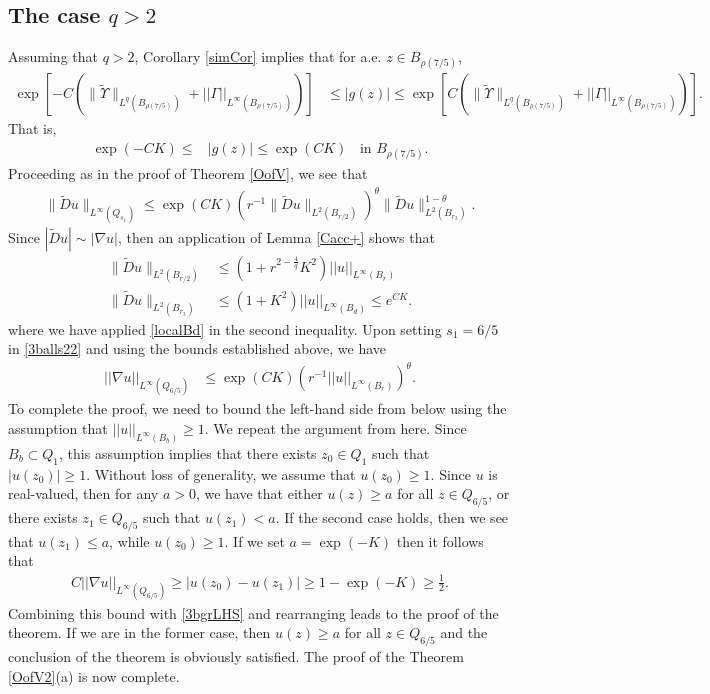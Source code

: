 \documentclass[12pt,reqno]{amsart}
\theoremstyle{plain}
\theoremstyle{definition}
\newcommand{\Ga}{\Gamma}
\newcommand{\te}{\theta}
\newcommand{\iny}{\infty}
\newcommand{\su}{\subset}
\newcommand{\gr}{\nabla}
\newcommand{\norm}[1]{\left\vert \left\vert #1\right\vert\right\vert}
\newcommand{\abs}[1]{\left\vert#1\right\vert}
\newcommand{\brac}[1]{\left[#1\right]}
\newcommand{\pr}[1]{\left( #1 \right) }
\begin{document}
\subsection{The case $q > 2$}
Assuming that $q > 2$, Corollary \ref{simCor} implies that for a.e. $z \in B_{\rho\pr{7/5}}$,
\begin{align*}
\exp\brac{-C \pr{ \|\widetilde \Upsilon\|_{L^q\pr{B_{\rho\pr{7/5}}}} +  \norm{\Ga}_{L^{\iny}\pr{B_{\rho\pr{7/5}}}}}} 
&\le \abs{g\pr{z}} \le \exp\brac{C \pr{ \|\widetilde \Upsilon\|_{L^q\pr{B_{\rho\pr{7/5}}}} +  \norm{\Ga}_{L^{\iny}\pr{B_{\rho\pr{7/5}}}}}}.
\end{align*}
That is,
\begin{align}
\exp\pr{-C K } \le & \abs{g\pr{z}} \le \exp\pr{C K} \;\; \text{ in } B_{\rho\pr{7/5}}.
\label{gBnd2}
\end{align}
Proceeding as in the proof of Theorem \ref{OofV}, we see that
\begin{align}
\| \widetilde D u\|_{L^\iny\pr{Q_{s_1}}} \le \exp\pr{C K} \pr{r^{-1}\|\widetilde D u\|_{L^2\pr{B_{r/2}}}}^\te \| \widetilde D u\|_{L^2\pr{B_{r_3}}}^{1 - \te}.
\label{3balls22}
\end{align}
Since $|\widetilde D u| \sim \abs{\gr u}$, then an application of Lemma \ref{Cacc+} shows that
\begin{align*}
\|\widetilde D u\|_{L^2\pr{B_{r/2}}} &\le \pr{1 + r^{2 - \frac 4 q} K^2 } \norm{u}_{L^\iny\pr{B_{r}}} \\
\|\widetilde D u\|_{L^2\pr{B_{r_3}}} &\le \pr{1 + K^2 } \norm{u}_{L^\iny\pr{B_{d}}} \le  e^{C K}.
\end{align*}
where we have applied \eqref{localBd} in the second inequality.
Upon setting $s_1 = 6/5$ in \eqref{3balls22} and using the bounds established above, we have
\begin{align}
\norm{\gr u}_{L^\iny\pr{Q_{6/5}}} 
&\le \exp\pr{C K} \pr{ r^{-1}\norm{ u}_{L^\iny\pr{B_{r}}}}^\te .
\label{3bgrLHS}
\end{align}
To complete the proof, we need to bound the left-hand side from below using the assumption that $\norm{u}_{L^\iny\pr{B_b}} \ge 1$.
We repeat the argument from \cite{KSW15} here.
Since $B_b \su Q_{1}$, this assumption implies that there exists $z_0 \in Q_1$ such that $\abs{u\pr{z_0}} \ge 1$. 
Without loss of generality, we assume that $u\pr{z_0} \ge 1$.
Since $u$ is real-valued, then for any $a > 0$, we have that either $u\pr{z} \ge a$ for all $z \in Q_{6/5}$, or there exists $z_1 \in Q_{6/5}$ such that $u\pr{z_1} < a$.
If the second case holds, then we see that $u\pr{z_1} \le a$, while $u\pr{z_0} \ge 1$.
If we set $a = \exp\pr{- K}$ then it follows that
\begin{align*}
C \norm{\gr u}_{L^\iny\pr{Q_{6/5}}} 
\ge \abs{u\pr{z_0} - u\pr{z_1}} 
\ge 1 - \exp\pr{- K} 
\ge \frac{1}{2}.
\end{align*}
Combining this bound with \eqref{3bgrLHS} and rearranging leads to the proof of the theorem.
If we are in the former case, then $u\pr{z} \ge a$ for all $z \in Q_{6/5}$ and the conclusion of the theorem is obviously satisfied.
The proof of the Theorem \ref{OofV2}(a) is now complete.
\end{document}
